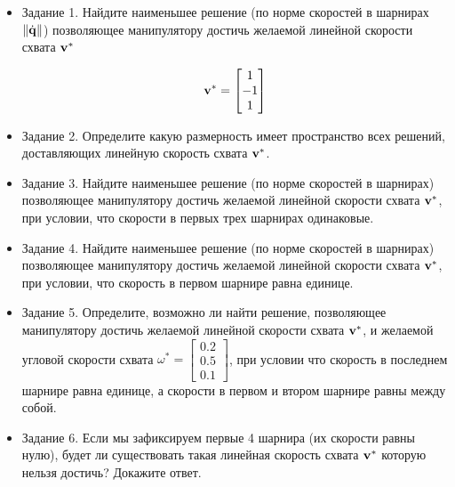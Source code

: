\documentclass[8pt]{article}
\begin{document}
\begin{itemize}

\item Задание 1. Найдите наименьшее решение (по норме скоростей в шарнирах $\|\dot{\mathbf{q}} \|$) позволяющее манипулятору достичь желаемой линейной скорости схвата $\mathbf{v}^*$

\begin{equation}
    \mathbf{v}^* = 
    \begin{bmatrix}
    1 \\
    -1 \\
    1
    \end{bmatrix}
\end{equation}

\item Задание 2. Определите какую размерность имеет пространство всех решений, доставляющих линейную скорость схвата $\mathbf{v}^*$.

\item Задание 3. Найдите наименьшее решение (по норме скоростей в шарнирах) позволяющее манипулятору достичь желаемой линейной скорости схвата $\mathbf{v}^*$, при условии, что скорости в первых трех шарнирах одинаковые.

\item Задание 4. Найдите наименьшее решение (по норме скоростей в шарнирах) позволяющее манипулятору достичь желаемой линейной скорости схвата $\mathbf{v}^*$, при условии, что скорость в первом шарнире равна единице.

\item Задание 5. Определите, возможно ли найти решение, позволяющее манипулятору достичь желаемой линейной скорости схвата $\mathbf{v}^*$, и желаемой угловой скорости схвата $\omega^*= 
    \begin{bmatrix}
    0.2 \\
    0.5 \\
    0.1
    \end{bmatrix}$, при условии что скорость в последнем шарнире равна единице, а скорости в первом и втором шарнире равны между собой.

\item Задание 6. Если мы зафиксируем первые 4 шарнира (их скорости равны нулю), будет ли существовать такая линейная скорость схвата $\mathbf{v}^*$ которую нельзя достичь? Докажите ответ.

\end{itemize}
\end{document}
